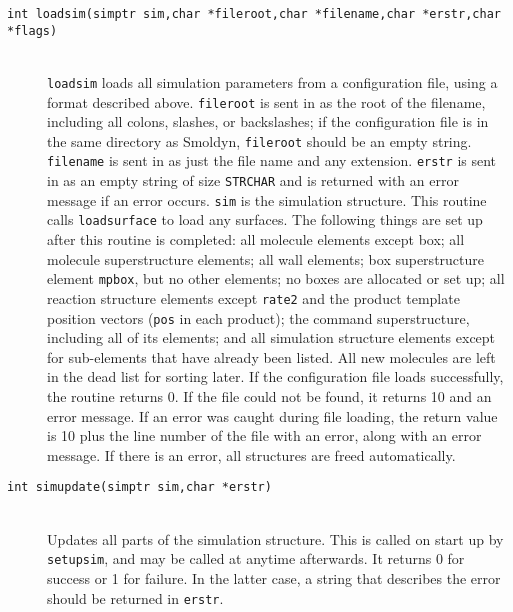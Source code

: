 \documentclass {book}
\begin{document}
\begin{description}
\item[\texttt{int loadsim(simptr sim,char *fileroot,char *filename,char *erstr,char *flags)}]
\hfill \\
\texttt{loadsim} loads all simulation parameters from a configuration file, using a format described above. \texttt{fileroot} is sent in as the root of the filename, including all colons, slashes, or backslashes; if the configuration file is in the same directory as Smoldyn, \texttt{fileroot} should be an empty string. \texttt{filename} is sent in as just the file name and any extension. \texttt{erstr} is sent in as an empty string of size \texttt{STRCHAR} and is returned with an error message if an error occurs. \texttt{sim} is the simulation structure. This routine calls \texttt{loadsurface} to load any surfaces. The following things are set up after this routine is completed: all molecule elements except box; all molecule superstructure elements; all wall elements; box superstructure element \texttt{mpbox}, but no other elements; no boxes are allocated or set up; all reaction structure elements except \texttt{rate2} and the product template position vectors (\texttt{pos} in each product); the command superstructure, including all of its elements; and all simulation structure elements except for sub-elements that have already been listed. All new molecules are left in the dead list for sorting later. If the configuration file loads successfully, the routine returns 0. If the file could not be found, it returns 10 and an error message. If an error was caught during file loading, the return value is 10 plus the line number of the file with an error, along with an error message. If there is an error, all structures are freed automatically.

\item[\texttt{int simupdate(simptr sim,char *erstr)}]
\hfill \\
Updates all parts of the simulation structure. This is called on start up by \texttt{setupsim}, and may be called at anytime afterwards. It returns 0 for success or 1 for failure. In the latter case, a string that describes the error should be returned in \texttt{erstr}.


\end{description}
\end{document}

